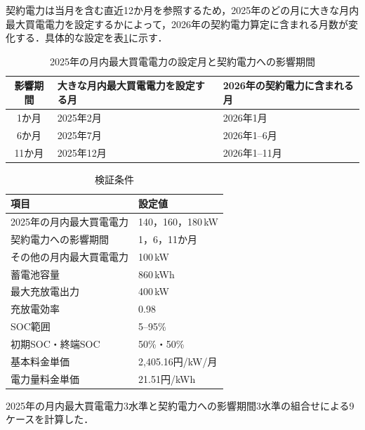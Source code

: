 \documentclass[a4paper,11pt,dvipdfmx]{jsarticle}
\begin{document}
契約電力は当月を含む直近12か月を参照するため，2025年のどの月に大きな月内最大買電電力を設定するかによって，2026年の契約電力算定に含まれる月数が変化する．具体的な設定を表\ref{tab:remaining_months}に示す．

\begin{table}[H]
    \centering
    \caption{2025年の月内最大買電電力の設定月と契約電力への影響期間}
    \label{tab:remaining_months}
    \begin{tabular}{c p{52mm} p{55mm}}
        \toprule
        影響期間 & 大きな月内最大買電電力を設定する月 & 2026年の契約電力に含まれる月 \\
        \midrule
        1か月  & 2025年2月           & 2026年1月          \\
        6か月  & 2025年7月           & 2026年1--6月       \\
        11か月 & 2025年12月          & 2026年1--11月      \\
        \bottomrule
    \end{tabular}
\end{table}

\begin{table}[H]
    \centering
    \caption{検証条件}
    \label{tab:experiment_conditions}
    \begin{tabular}{ll}
        \toprule
        項目             & 設定値             \\
        \midrule
        2025年の月内最大買電電力 & 140，160，180\,kW \\
        契約電力への影響期間     & 1，6，11か月        \\
        その他の月内最大買電電力   & 100\,kW         \\
        蓄電池容量          & 860\,kWh        \\
        最大充放電出力        & 400\,kW         \\
        充放電効率          & 0.98            \\
        SOC範囲          & 5--95\%         \\
        初期SOC・終端SOC    & 50\%・50\%       \\
        基本料金単価         & 2,405.16円/kW/月  \\
        電力量料金単価        & 21.51円/kWh      \\
        \bottomrule
    \end{tabular}
\end{table}

2025年の月内最大買電電力3水準と契約電力への影響期間3水準の組合せによる9ケースを計算した．
\end{document}
